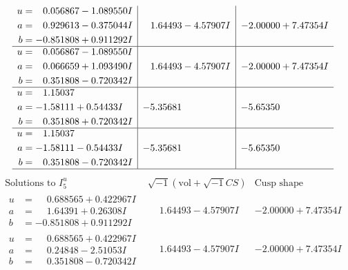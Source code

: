 \documentclass[1p]{elsarticle_modified}
\theoremstyle{definition}
\newcommand{\I}{\sqrt{-1}}
\begin{document}
$$\begin{array}{c|c|c}
\begin{aligned}
u &= \phantom{-}0.056867 - 1.089550 I \\
a &= \phantom{-}0.929613 - 0.375044 I \\
b &= -0.851808 + 0.911292 I\end{aligned}
 & \phantom{-}1.64493 - 4.57907 I & -2.00000 + 7.47354 I \\ \hline\begin{aligned}
u &= \phantom{-}0.056867 - 1.089550 I \\
a &= \phantom{-}0.066659 + 1.093490 I \\
b &= \phantom{-}0.351808 - 0.720342 I\end{aligned}
 & \phantom{-}1.64493 - 4.57907 I & -2.00000 + 7.47354 I \\ \hline\begin{aligned}
u &= \phantom{-}1.15037\phantom{ +0.000000I} \\
a &= -1.58111 + 0.54433 I \\
b &= \phantom{-}0.351808 + 0.720342 I\end{aligned}
 & -5.35681\phantom{ +0.000000I} & -5.65350\phantom{ +0.000000I} \\ \hline\begin{aligned}
u &= \phantom{-}1.15037\phantom{ +0.000000I} \\
a &= -1.58111 - 0.54433 I \\
b &= \phantom{-}0.351808 - 0.720342 I\end{aligned}
 & -5.35681\phantom{ +0.000000I} & -5.65350\phantom{ +0.000000I}\\
 \hline 
 \end{array}$$\newpage$$\begin{array}{c|c|c}  
\text{Solutions to }I^u_{5}& \I (\text{vol} + \sqrt{-1}CS) & \text{Cusp shape}\\
 \hline 
\begin{aligned}
u &= \phantom{-}0.688565 + 0.422967 I \\
a &= \phantom{-}1.64391 + 0.26308 I \\
b &= -0.851808 + 0.911292 I\end{aligned}
 & \phantom{-}1.64493 - 4.57907 I & -2.00000 + 7.47354 I \\ \hline\begin{aligned}
u &= \phantom{-}0.688565 + 0.422967 I \\
a &= \phantom{-}0.24848 - 2.51053 I \\
b &= \phantom{-}0.351808 - 0.720342 I\end{aligned}
 & \phantom{-}1.64493 - 4.57907 I & -2.00000 + 7.47354 I \\ \hline\begin{aligned}

\end{aligned}
\end{array}$$
\end{document}
